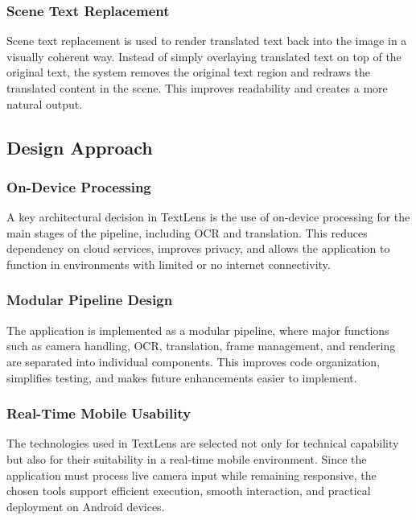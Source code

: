\subsubsection{Scene Text Replacement}
Scene text replacement is used to render translated text back into the image in a visually coherent way. Instead of simply overlaying translated text on top of the original text, the system removes the original text region and redraws the translated content in the scene. This improves readability and creates a more natural output.

\subsection{Design Approach}

\subsubsection{On-Device Processing}
A key architectural decision in TextLens is the use of on-device processing for the main stages of the pipeline, including OCR and translation. This reduces dependency on cloud services, improves privacy, and allows the application to function in environments with limited or no internet connectivity.

\subsubsection{Modular Pipeline Design}
The application is implemented as a modular pipeline, where major functions such as camera handling, OCR, translation, frame management, and rendering are separated into individual components. This improves code organization, simplifies testing, and makes future enhancements easier to implement.

\subsubsection{Real-Time Mobile Usability}
The technologies used in TextLens are selected not only for technical capability but also for their suitability in a real-time mobile environment. Since the application must process live camera input while remaining responsive, the chosen tools support efficient execution, smooth interaction, and practical deployment on Android devices.
